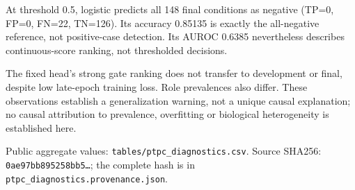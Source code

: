 At threshold 0.5, logistic predicts all 148 final conditions as negative (TP=0, FP=0, FN=22, TN=126). Its accuracy 0.85135 is exactly the all-negative reference, not positive-case detection. Its AUROC 0.6385 nevertheless describes continuous-score ranking, not thresholded decisions.

The fixed head's strong gate ranking does not transfer to development or final, despite low late-epoch training loss. Role prevalences also differ. These observations establish a generalization warning, not a unique causal explanation; no causal attribution to prevalence, overfitting or biological heterogeneity is established here.

\noindent\footnotesize Public aggregate values: \texttt{tables/ptpc\_diagnostics.csv}. Source SHA256: \texttt{0ae97bb895258bb5\ldots}; the complete hash is in \texttt{ptpc\_diagnostics.provenance.json}.\normalsize
